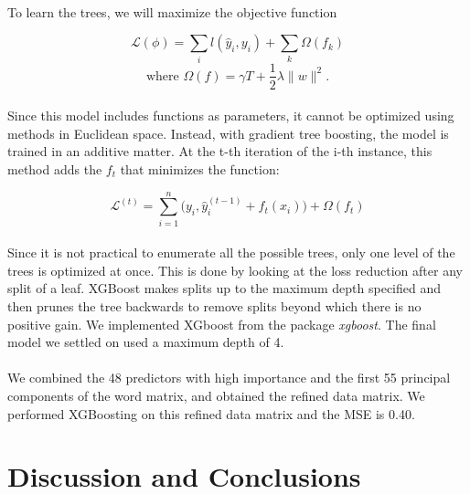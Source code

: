 \documentclass[paper=a4, fontsize=11pt]{scrartcl} %
\numberwithin{equation}{section} %
\numberwithin{figure}{section} %
\numberwithin{table}{section} %
\begin{document}
{\paragraph{}
To learn the trees, we will maximize the objective function

$$\mathcal{L}(\phi) = \sum_i l(\hat{y}_i, y_i) + \sum_k \Omega( f_k )$$
$$\text{where } \Omega( f ) = \gamma T + \frac{1}{2} \lambda \| w \|^2.$$

\paragraph{}
Since this model includes functions as parameters, it cannot be optimized using methods in Euclidean space. Instead, with gradient tree boosting, the model is trained in an additive matter. At the t-th iteration of the i-th instance, this method adds the $f_t$ that minimizes the function:

$$\mathcal{L}^{(t)} = \sum_{i=1}^n \big(y_i, \hat{y}_i ^{(t-1)} + f_t (x_i)\big) + \Omega(f_t) $$

\paragraph{}
Since it is not practical to enumerate all the possible trees, only one level of the trees is optimized at once. This is done by looking at the loss reduction after any split of a leaf. XGBoost makes splits up to the maximum depth specified and then prunes the tree backwards to remove splits beyond which there is no positive gain. We implemented XGboost from the package \textit{xgboost}. The final model we settled on used a maximum depth of 4.

\paragraph{}
We combined the 48 predictors with high importance and the first 55 principal components of the word matrix, and obtained the refined data matrix. We performed XGBoosting on this refined data matrix and the MSE is 0.40.


%
%

\section{Discussion and Conclusions}

}
\end{document}
